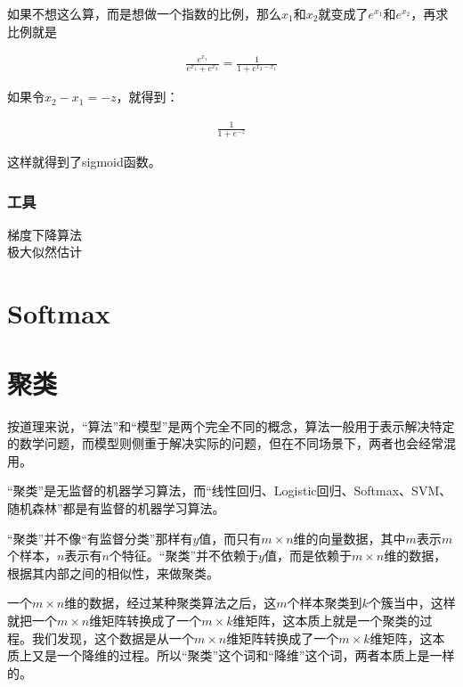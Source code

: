 \documentclass[UTF8]{ctexbook}
\begin{document}
如果不想这么算，而是想做一个指数的比例，那么$x_{1}$和$x_{2}$就变成了$e^{x_{1}}$和$e^{x_{2}}$，再求比例就是

\begin{equation}
\begin{aligned}
\frac{e^{x_{1}}}{e^{x_{1}}+e^{x_{2}}} = \frac{1}{1+e^{x_{2}-x_{1}}}
\end{aligned}
\end{equation}

如果令$x_{2}-x_{1}=-z$，就得到：

\begin{equation}
\begin{aligned}
\frac{1}{1+e^{-z}}
\end{aligned}
\end{equation}

这样就得到了sigmoid函数。

\subsection{工具}
梯度下降算法\\
极大似然估计\\

\chapter{Softmax}

\chapter{聚类}

按道理来说，“算法”和“模型”是两个完全不同的概念，算法一般用于表示解决特定的数学问题，而模型则侧重于解决实际的问题，但在不同场景下，两者也会经常混用。

“聚类”是无监督的机器学习算法，而“线性回归、Logistic回归、Softmax、SVM、随机森林”都是有监督的机器学习算法。

“聚类”并不像“有监督分类”那样有$y$值，而只有$m \times n$维的向量数据，其中$m$表示$m$个样本，$n$表示有$n$个特征。“聚类”并不依赖于$y$值，而是依赖于$m \times n$维的数据，根据其内部之间的相似性，来做聚类。

一个$m \times n$维的数据，经过某种聚类算法之后，这$m$个样本聚类到$k$个簇当中，这样就把一个$m \times n$维矩阵转换成了一个$m \times k$维矩阵，这本质上就是一个聚类的过程。我们发现，这个数据是从一个$m \times n$维矩阵转换成了一个$m \times k$维矩阵，这本质上又是一个降维的过程。所以“聚类”这个词和“降维”这个词，两者本质上是一样的。
\end{document}
